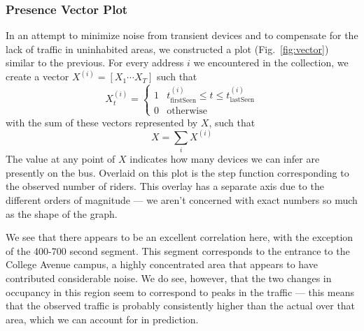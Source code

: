 \subsubsection*{Presence Vector Plot}

In an attempt to minimize noise from transient devices and to compensate for the lack of traffic in uninhabited areas, we constructed a plot (Fig.~\ref{fig:vector}) similar to the previous.
For every address $i$ we encountered in the collection, we create a vector \(X^{(i)}= [ X_1 \cdots X_T ] \) such that
\begin{equation*}
  X_t^{(i)} = \begin{cases}
    1 & t_{\text{firstSeen}}^{(i)} \le t \le t_{\text{lastSeen}}^{(i)}\\
    0 & \text{otherwise}
  \end{cases}
\end{equation*}
with the sum of these vectors represented by $X$, such that \[X = \sum\limits_i X^{(i)}\]
The value at any point of $X$ indicates how many devices we can infer are presently on the bus.
Overlaid on this plot is the step function corresponding to the observed number of riders.
This overlay has a separate axis due to the different orders of magnitude --- we aren't concerned with exact numbers so much as the shape of the graph.

We see that there appears to be an excellent correlation here, with the exception of the 400-700 second segment. %
This segment corresponds to the entrance to the College Avenue campus, a highly concentrated area that appears to have contributed considerable noise.
We do see, however, that the two changes in occupancy in this region seem to correspond to peaks in the traffic --- this means that the observed traffic is probably consistently higher than the actual over that area, which we can account for in prediction.
